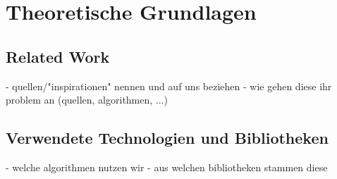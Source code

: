 \chapter{Theoretische Grundlagen}

\section{Related Work}
- quellen/"inspirationen" nennen und auf uns beziehen
- wie gehen diese ihr problem an (quellen, algorithmen, ...)

\section{Verwendete Technologien und Bibliotheken}
- welche algorithmen nutzen wir
- aus welchen bibliotheken stammen diese